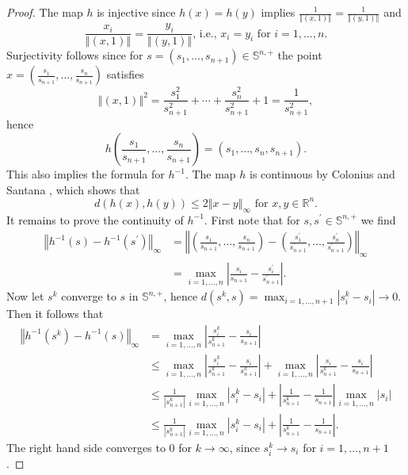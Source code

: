 \documentclass[preprint,12pt]{elsarticle}
\begin{document}
\begin{proof}
The map $h$ is injective since $h(x)=h(y)$ implies $\frac{1}{\left\Vert
(x,1)\right\Vert }=\frac{1}{\left\Vert (y,1)\right\Vert }$ and%
\[
\frac{x_{i}}{\left\Vert (x,1)\right\Vert }=\frac{y_{i}}{\left\Vert
(y,1)\right\Vert }\text{, i.e., }x_{i}=y_{i}\text{ for }i=1,\ldots,n.
\]
Surjectivity follows since for $s=(s_{1},\ldots,s_{n+1})\in\mathbb{S}^{n,+}$
the point $x=\left(  \frac{s_{1}}{s_{n+1}},\ldots,\frac{s_{n}}{s_{n+1}%
}\right)  $ satisfies%
\[
\left\Vert (x,1)\right\Vert ^{2}=\frac{s_{1}^{2}}{s_{n+1}^{2}}+\cdots
+\frac{s_{n}^{2}}{s_{n+1}^{2}}+1=\frac{1}{s_{n+1}^{2}},
\]
hence
\[
h\left(  \frac{s_{1}}{s_{n+1}},\ldots,\frac{s_{n}}{s_{n+1}}\right)  =\left(
s_{1},\ldots,s_{n},s_{n+1}\right)  .
\]
This also implies the formula for $h^{-1}$. The map $h$ is continuous by
Colonius and Santana \cite[Proposition 9(iii)]{ColS24a}, which shows that
\[
d(h(x),h(y))\leq2\left\Vert x-y\right\Vert _{\infty}\text{ for }%
x,y\in\mathbb{R}^{n}.
\]
It remains to prove the continuity of $h^{-1}$. First note that for $s,s^{\prime
}\in\mathbb{S}^{n,+}$ we find%
\begin{align*}
\left\Vert h^{-1}(s)-h^{-1}(s^{\prime})\right\Vert _{\infty}  &  =\left\Vert
\left(  \frac{s_{1}}{s_{n+1}},\ldots,\frac{s_{n}}{s_{n+1}}\right)  -\left(
\frac{s_{1}^{\prime}}{s_{n+1}^{\prime}},\ldots,\frac{s_{n}^{\prime}}%
{s_{n+1}^{\prime}}\right)  \right\Vert _{\infty}\\
&  =\max_{i=1,\ldots,n}\left\vert \frac{s_{i}}{s_{n+1}}-\frac{s_{i}^{\prime}%
}{s_{n+1}^{\prime}}\right\vert .
\end{align*}
Now let $s^{k}$ converge to $s$ in $\mathbb{S}^{n,+}$, hence $d(s^{k}%
,s)=\max_{i=1,\ldots,n+1}\left\vert s_{i}^{k}-s_{i}\right\vert \rightarrow0$.
Then it follows that%
\begin{align*}
\left\Vert h^{-1}(s^{k})-h^{-1}(s)\right\Vert _{\infty}  &  =\max
_{i=1,\ldots,n}\left\vert \frac{s_{i}^{k}}{s_{n+1}^{k}}-\frac{s_{i}}{s_{n+1}%
}\right\vert \\
&  \leq\max_{i=1,\ldots,n}\left\vert \frac{s_{i}^{k}}{s_{n+1}^{k}}-\frac
{s_{i}}{s_{n+1}^{k}}\right\vert +\max_{i=1,\ldots,n}\left\vert \frac{s_{i}%
}{s_{n+1}^{k}}-\frac{s_{i}}{s_{n+1}}\right\vert \\
&  \leq\frac{1}{\left\vert s_{n+1}^{k}\right\vert }\max_{i=1,\ldots
,n}\left\vert s_{i}^{k}-s_{i}\right\vert +\left\vert \frac{1}{s_{n+1}^{k}%
}-\frac{1}{s_{n+1}}\right\vert \max_{i=1,\ldots,n}\left\vert s_{i}\right\vert
\\
&  \leq\frac{1}{\left\vert s_{n+1}^{k}\right\vert }\max_{i=1,\ldots
,n}\left\vert s_{i}^{k}-s_{i}\right\vert +\left\vert \frac{1}{s_{n+1}^{k}%
}-\frac{1}{s_{n+1}}\right\vert .
\end{align*}
The right hand side converges to $0$ for $k\rightarrow\infty$, since
$s_{i}^{k}\rightarrow s_{i}$ for $i=1,\ldots,n+1$.
\end{proof}
\end{document}
